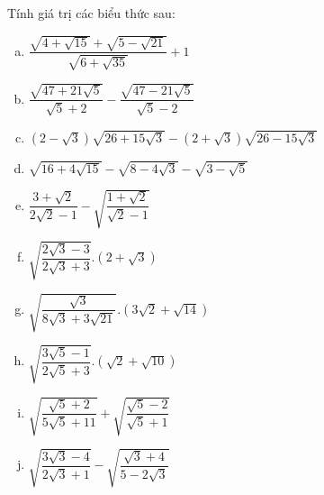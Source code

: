 \begin{bt}%
	Tính giá trị các biểu thức sau:
	\begin{enumerate}[a)]
		
		\item $\dfrac{\sqrt{4+\sqrt{15}}+\sqrt{5-\sqrt{21}}}{\sqrt{6+\sqrt{35}}}+1 $
		\item  $\dfrac{\sqrt{47+21\sqrt{5}}}{\sqrt{5}+2}-\dfrac{\sqrt{47-21\sqrt{5}}}{\sqrt{5}-2} $
		\item  $(2-\sqrt{3})\sqrt{26+15\sqrt{3}}-(2+\sqrt{3})\sqrt{26-15\sqrt{3}} $
		\item  $\sqrt{16+4\sqrt{15}}-\sqrt{8-4\sqrt{3}}-\sqrt{3-\sqrt{5}}$
		\item $\dfrac{3+\sqrt{2}}{2\sqrt{2}-1}-\sqrt{\dfrac{1+\sqrt{2}}{\sqrt{2}-1}} $
		\item  $\sqrt{\dfrac{2\sqrt{3}-3}{2\sqrt{3}+3}}.(2+\sqrt{3}) $
		\item  $\sqrt{\dfrac{\sqrt{3}}{8\sqrt{3}+3\sqrt{21}}}.(3\sqrt{2}+\sqrt{14}) $
		\item  $\sqrt{\dfrac{3\sqrt{5}-1}{2\sqrt{5}+3}}.(\sqrt{2}+\sqrt{10}) $
		\item $\sqrt{\dfrac{\sqrt{5}+2}{5\sqrt{5}+11}}+\sqrt{\dfrac{\sqrt{5}-2}{\sqrt{5}+1}} $
		\item $\sqrt{\dfrac{3\sqrt{3}-4}{2\sqrt{3}+1}}-\sqrt{\dfrac{\sqrt{3}+4}{5-2\sqrt{3}}} $
		
	\end{enumerate}
	\loigiai{
		\begin{enumerate}[a)]
			

\end{enumerate}}
\end{bt}
